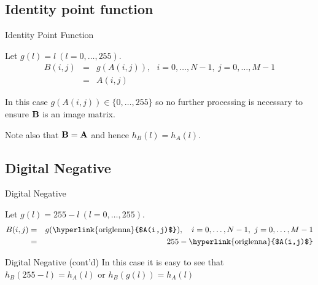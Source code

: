 \subsection{Identity point function}
%
%
\begin{slide}{Identity Point Function}
\begin{titlelist}{}{}

\item<2-> 
Let $g(l)=l\ (l=0,\ldots,255)$.
\begin{eqnarray*}
B(i,j)&=&g(A(i,j)),\ \ \ i=0,\ldots,N-1,\ j=0,\ldots,M-1 \\
    &=&A(i,j)
\end{eqnarray*}

\item<3-> In this case $g(A(i,j)) \in \{0,\ldots,255\}$ so no further
processing is necessary to ensure ${\bf B}$ is an image matrix.

\item<4-> Note also that ${\bf B=A}$ and hence $h_B(l)=h_A(l)$.

\end{titlelist}

\end{slide}

\subsection{Digital Negative}
%
%
\begin{slide}{Digital Negative}

Let $g(l)=255-l\ (l=0,\ldots,255)$.
\begin{eqnarray*}
B(i,j) &=& g(\text{\hyperlink{origlenna}{$A(i,j)$}}),\ \ \ i=0,\ldots,N-1,\ j=0,\ldots,M-1 \\
    &=& 255- \text{\hyperlink{origlenna}{$A(i,j)$}}
\end{eqnarray*}

\centering{}

\end{slide}


%
%
\begin{slide}{Digital Negative (cont'd)}
\centering
In this case it is easy to see that $h_B(255-l)=h_A(l)$ or $h_B(g(l))=h_A(l)$

\end{slide}

